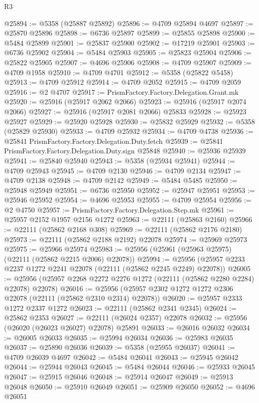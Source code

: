 \begin{lexlean}{R3}
\begin{coremodule}
@25894 := @5358 (@25887 @25892)
@25896 := @4709 @25894 @4697
@25897 := @25870 @25896
@25898 := @6736 @25897
@25899 := @25855 @25898
@25900 := @5484 @25899
@25901 := @25837 @25900
@25902 := @17219 @25901
@25903 := @6736 @25902
@25904 := @5484 @25903
@25905 := @25823 @25904
@25906 := @25822 @25905
@25907 := @4696 @25906
@25908 := @4709 @25907
@25909 := @4709 @1958
@25910 := @4709 @4701
@25912 := @5358 (@25822 @5458)
@25913 := @4709 @25912
@25914 := @4709 @2052
@25915 := @4709 @2059
@25916 := @2 @4707
@25917 := PrismFactory.Factory.Delegation.Grant.mk
@25920 := @25916 (@25917 @2062 @2066)
@25923 := @25916 (@25917 @2074 @2066)
@25927 := @25916 (@25917 @2081 @2066) @25833
@25928 := @25923 @25927
@25929 := @25920 @25928
@25930 := @25832 @25929
@25932 := @5358 (@25829 @25930)
@25933 := @4709 @25932
@25934 := @4709 @4738
@25936 := @25841 PrismFactory.Factory.Delegation.Duty.fetch
@25939 := @25841 PrismFactory.Factory.Delegation.Duty.sign @25848
@25940 := @25936 @25939
@25941 := @25840 @25940
@25943 := @5358 (@25934 @25941)
@25944 := @4709 @25943
@25945 := @4709 @2130
@25946 := @4709 @2134
@25947 := @4709 @2138
@25948 := @4709 @2142
@25949 := @5484 @5485
@25950 := @25948 @25949
@25951 := @6736 @25950
@25952 := @25947 @25951
@25953 := @25946 @25952
@25954 := @4696 @25953
@25955 := @4709 @25954
@25956 := @2 @4750
@25957 := PrismFactory.Factory.Delegation.Step.mk
@25961 := @25957 @2152 @1957 @2156 @1272
@25963 := @22111 (@25863 @2160)
@25966 := @22111 (@25862 @2168 @308)
@25969 := @22111 (@25862 @2176 @2180)
@25973 := @22111 (@25862 @2188 @2192) @22078
@25974 := @25969 @25973
@25975 := @25966 @25974
@25983 := @25956 (@25961 (@25963 @25975) (@22111 (@25862 @2215 @2006) @22078))
@25994 := @25956 (@25957 @2233 @2237 @1272 @2241 @22078 (@22111 (@25862 @2245 @2249) @22078))
@26005 := @25956 (@25957 @2268 @2272 @2276 @1272 (@22111 (@25862 @2280 @2284) @22078) @22078)
@26016 := @25956 (@25957 @2302 @1272 @1272 @2306 @22078 (@22111 (@25862 @2310 @2314) @22078))
@26020 := @25957 @2333 @1272 @2337 @1272
@26023 := @22111 (@25862 @2341 @2345)
@26024 := @25862 @2353
@26027 := @22111 (@26024 @2357) @22078
@26032 := @25956 (@26020 (@26023 @26027) @22078) @25891
@26033 := @26016 @26032
@26034 := @26005 @26033
@26035 := @25994 @26034
@26036 := @25983 @26035
@26037 := @25890 @26036
@26039 := @5358 (@25955 @26037)
@26041 := @4709 @26039 @4697
@26042 := @5484 @26041
@26043 := @25945 @26042
@26044 := @25944 @26043
@26045 := @5484 @26044
@26046 := @25933 @26045
@26047 := @25915 @26046
@26048 := @25914 @26047
@26049 := @25913 @26048
@26050 := @25910 @26049
@26051 := @25909 @26050
@26052 := @4696 @26051

\end{coremodule}
\end{lexlean}
